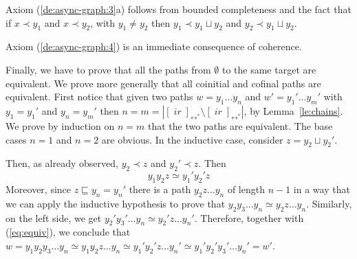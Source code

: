 \documentclass[conference]{IEEEtran}
\renewenvironment{proof}{\begin{IEEEproof}}{\end{IEEEproof}}
\newcommand{\ir}[1]{\ensuremath{\mathop{\mathit{ir}({#1})}}}
\newcommand{\eqclass}[2][]{\ensuremath{[{#2}]_{\scriptscriptstyle {#1}}}}
\newcommand{\eqclassir}[1]{\ensuremath{\eqclass[\leftrightarrow^*]{#1}}}
\begin{document}
\begin{proof}
  Axiom (\ref{de:async-graph:3}a) follows from bounded completeness
  and the fact that if $x \prec y_1$ and $x \prec y_2$, with
  $y_1 \neq y_2$ then $y_1 \prec y_1 \sqcup y_2$ and
  $y_2 \prec y_1 \sqcup y_2$.

  Axiom (\ref{de:async-graph:4}) is an immediate
  consequence of coherence.

  Finally, we have to prove that all the paths from $\emptyset$ to the
  same target are equivalent. We prove more generally that all
  coinitial and cofinal paths are equivalent. First 
  notice that given
  two paths $w = y_1 \ldots y_n$ and $w' = y_1' \ldots y_m'$ with
  $y_1=y_1'$ and $y_n=y_m'$ then  $n=m=|\eqclassir{\ir{y_n}} \setminus \eqclassir{\ir{y_1}}|$, by Lemma~\ref{le:chains}. We prove
  by induction on $n=m$ that the two paths are equivalent. The base
  cases $n=1$ and $n=2$ are obvious.
  In the inductive case, consider
  $z = y_2 \sqcup y_2'$.
  \begin{center}
  \end{center}
  
  Then, as already observed, $y_2 \prec z$ and
  $y_2' \prec z$. Then
  \begin{equation}
    \label{eq:equiv}
    y_1 y_2 z \simeq y_1' y_2' z
  \end{equation}
  Moreover, since $z \sqsubseteq y_n=y_n'$ there is a path
  $y_2 z \ldots y_n$ of length $n-1$ in a way that we can apply the
  inductive hypothesis to prove that
  $y_2 y_3 \ldots y_n \simeq y_2 z \ldots y_n$.  Similarly, on the
  left side, we get $y_2' y_3' \ldots y_n \simeq y_2' z \ldots
  y_n'$. Therefore, together with (\ref{eq:equiv}), we conclude that
  $w= y_1 y_2 y_3 \ldots y_n \simeq y_1 y_2 z \ldots y_n \simeq y_1'
  y_2' z \ldots y_n' \simeq y_1' y_2' y_3' \ldots y_n' = w'$.


\end{proof}
\end{document}
